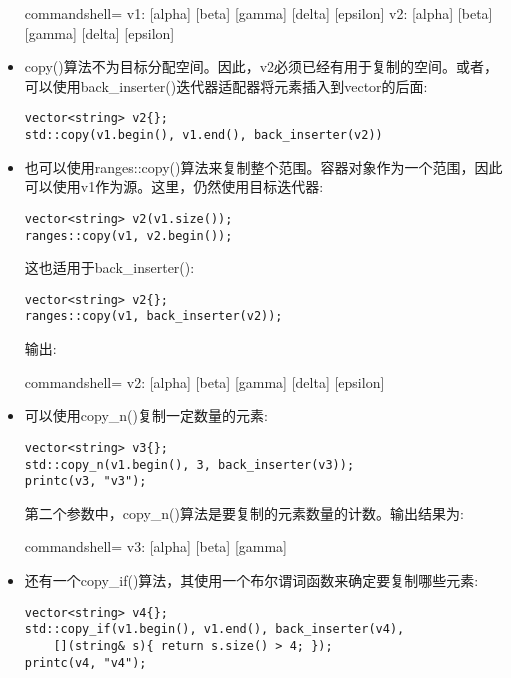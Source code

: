 \begin{itemize}
\begin{tcblisting}{commandshell={}}
v1: [alpha] [beta] [gamma] [delta] [epsilon]
v2: [alpha] [beta] [gamma] [delta] [epsilon]
\end{tcblisting}

\item 
copy()算法不为目标分配空间。因此，v2必须已经有用于复制的空间。或者，可以使用back\_inserter()迭代器适配器将元素插入到vector的后面:

\begin{lstlisting}[style=styleCXX]
vector<string> v2{};
std::copy(v1.begin(), v1.end(), back_inserter(v2))
\end{lstlisting}

\item 
也可以使用ranges::copy()算法来复制整个范围。容器对象作为一个范围，因此可以使用v1作为源。这里，仍然使用目标迭代器:

\begin{lstlisting}[style=styleCXX]
vector<string> v2(v1.size());
ranges::copy(v1, v2.begin());
\end{lstlisting}

这也适用于back\_inserter():

\begin{lstlisting}[style=styleCXX]
vector<string> v2{};
ranges::copy(v1, back_inserter(v2));
\end{lstlisting}

输出:

\begin{tcblisting}{commandshell={}}
v2: [alpha] [beta] [gamma] [delta] [epsilon]
\end{tcblisting}

\item 
可以使用copy\_n()复制一定数量的元素:

\begin{lstlisting}[style=styleCXX]
vector<string> v3{};
std::copy_n(v1.begin(), 3, back_inserter(v3));
printc(v3, "v3");
\end{lstlisting}

第二个参数中，copy\_n()算法是要复制的元素数量的计数。输出结果为:

\begin{tcblisting}{commandshell={}}
v3: [alpha] [beta] [gamma]
\end{tcblisting}

\item 
还有一个copy\_if()算法，其使用一个布尔谓词函数来确定要复制哪些元素:

\begin{lstlisting}[style=styleCXX]
vector<string> v4{};
std::copy_if(v1.begin(), v1.end(), back_inserter(v4),
	[](string& s){ return s.size() > 4; });
printc(v4, "v4");
\end{lstlisting}


\end{itemize}
